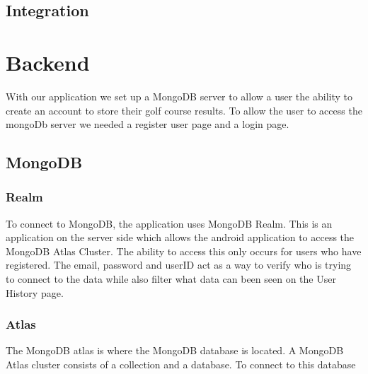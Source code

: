 \subsection{Integration}

\section{Backend}
With our application we set up a MongoDB server to allow a user the ability to create an account to store their golf course results. To allow the user to access the mongoDb server we needed a register user page and a login page.
\subsection{MongoDB}
\subsubsection{Realm}
To connect to MongoDB, the application uses MongoDB Realm. This is an application on the server side which allows the android application to access the MongoDB Atlas Cluster. The ability to access this only occurs for users who have registered. The email, password and userID act as a way to verify who is trying to connect to the data while also filter what data can been seen on the User History page.
\subsubsection{Atlas}
The MongoDB atlas is where the MongoDB database is located. A MongoDB Atlas cluster consists of a collection and a database. To connect to this database
